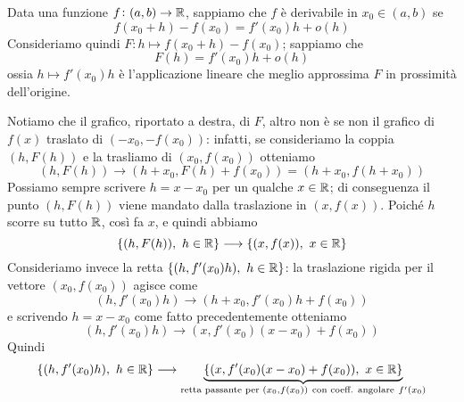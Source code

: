 Data una funzione $f\colon(a,b)\to\amsbb{R}$, sappiamo che $f$ è derivabile in $x_0\in(a,b)$ se 
\[
f(x_0+h) -f(x_0) = f'(x_0)h+o(h)
\]
Consideriamo quindi $F\colon h\mapsto f(x_0+h)-f(x_0)$; sappiamo che
\[
F(h) = f'(x_0)h +o(h)
\]
ossia $h\mapsto f'(x_0)h$ è l'applicazione lineare che meglio approssima $F$ in prossimità dell'origine.
\begin{center}
    \begin{minipage}{.45\linewidth}
        \centering
    \end{minipage}
    \hspace{1pt}
    \begin{minipage}{.45\linewidth}
        \centering
    \end{minipage}
\end{center}
Notiamo che il grafico, riportato a destra, di $F$, altro non è se non il grafico di $f(x)$ traslato di $(-x_0, -f(x_0))$: infatti, se consideriamo la coppia $(h, F(h))$ e la trasliamo di $(x_0, f(x_0))$ otteniamo
\[
(h, F(h)) \longrightarrow (h+x_0, F(h)+f(x_0)) = (h+x_0, f(h+x_0))
\]
Possiamo sempre scrivere $h=x-x_0$ per un qualche $x\in\amsbb{R}$; di conseguenza il punto $(h, F(h))$ viene mandato dalla traslazione in $(x,f(x))$. Poiché $h$ scorre su tutto $\amsbb{R}$, così fa $x$, e quindi abbiamo
\[
\{(h, F(h)), \ h\in\amsbb{R}\}\longrightarrow \{(x, f(x)), \ x\in\amsbb{R}\}
\]
Consideriamo invece la retta $\{(h, f'(x_0)h), \ h\in\amsbb{R}\}$: la traslazione rigida per il vettore $(x_0, f(x_0))$ agisce come
\[
(h, f'(x_0)h)\longrightarrow (h+x_0, f'(x_0)h+f(x_0))
\]
e scrivendo $h=x-x_0$ come fatto precedentemente otteniamo
\[
(h, f'(x_0)h)\longrightarrow (x, f'(x_0)(x-x_0) + f(x_0))
\]
Quindi
\[
\{(h, f'(x_0)h), \ h\in\amsbb{R}\} \longrightarrow \underbrace{\{(x, f'(x_0)(x-x_0)+f(x_0)), \ x\in\amsbb{R}\}}_{\text{retta passante per }(x_0, f(x_0)) \ \text{con coeff. angolare} \ f'(x_0)}
\]
